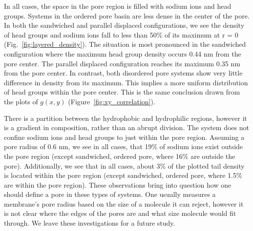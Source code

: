 \documentclass{article}
\begin{document}
  In all cases, the space in the pore region is filled with sodium ions and
  head groups. Systems in the ordered pore basin are less dense in
  the center of the pore. In both the sandwiched and parallel displaced
  configurations, we see the density of head groups and sodium ions fall to less
  than 50\% of its maximum at r = 0 (Fig.~\ref{fig:layered_density}). The
  situation is most pronounced in the sandwiched configuration where the maximum
  head group density occurs 0.44 nm from the pore center. The parallel displaced
  configuration reaches its maximum 0.35 nm from the pore center. In contrast,
  both disordered pore systems show very little difference in density from its
  maximum. This implies a more uniform distribution of head groups within the
  pore center. This is the same conclusion drawn from the plots of $g(x,y)$ 
  (Figure~\ref{fig:xy_correlation}). 

  There is a partition between the hydrophobic and hydrophilic regions, however
  it is a gradient in composition, rather than an abrupt division. The system
  does not confine sodium ions and head groups to just within the pore region.
  Assuming a pore radius of 0.6 nm, we see in all cases, that 19\% of sodium ions
  exist outside the pore region (except sandwiched, ordered pore, where 16\%
  are outside the pore). Additionally, we see that in all cases, about 3\% of the
  plotted tail density is located within the pore region (except sandwiched,
  ordered pore, where 1.5\% are within the pore region). These observations bring
  into question how one should define a pore in these types of systems. One
  usually measures a membrane's pore radius based on the size of a molecule it
  can reject, however it is not clear where the edges of the pores are and what
  size molecule would fit through. We leave these investigations for a future
  study.
\end{document}

